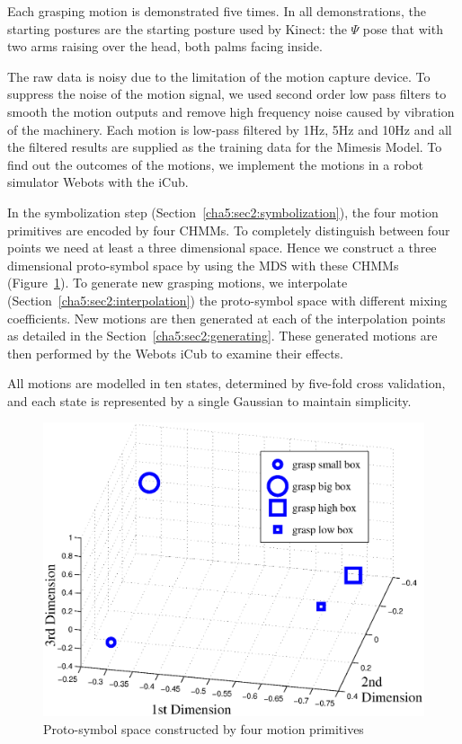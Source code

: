 Each grasping motion is demonstrated five times. In all demonstrations, the starting postures are the starting posture used by Kinect: the $\Psi$ pose that with two arms raising over the head, both palms facing inside.

The raw data is noisy due to the limitation of the motion capture device. To suppress the noise of the motion signal, we used second order low pass filters to smooth the motion outputs and remove high frequency noise caused by vibration of the machinery. Each motion is low-pass filtered by 1Hz, 5Hz and 10Hz and all the filtered results are supplied as the training data for the Mimesis Model. To find out the outcomes of the motions, we implement the motions in a robot simulator Webots with the iCub.

In the symbolization step (Section~\ref{cha5:sec2:symbolization}), the four motion primitives are encoded by four CHMMs. To completely distinguish between four points we need at least a three dimensional space. Hence we construct a three dimensional proto-symbol space by using the MDS with these CHMMs (Figure~\ref{fig:pss}). To generate new grasping motions, we interpolate (Section~\ref{cha5:sec2:interpolation}) the proto-symbol space with different mixing coefficients. New motions are then generated at each of the interpolation points as detailed in the Section~\ref{cha5:sec2:generating}. These generated motions are then performed by the Webots iCub to examine their effects.


All motions are modelled in ten states, determined by five-fold cross validation, and each state is represented by a single Gaussian to maintain simplicity.


\begin{figure}
  \centering
  \includegraphics[width=12cm]{./fig_cha5/pss2.eps}
  \caption{ \scriptsize{Proto-symbol space constructed by four motion primitives}
}
    \label{fig:pss}
\end{figure}


